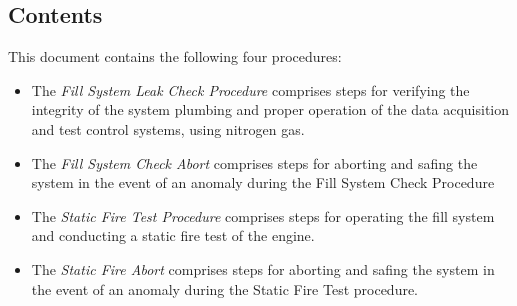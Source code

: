 
\subsection{Contents}
This document contains the following four procedures:
\begin{itemize}
    \item The \textit{Fill System Leak Check Procedure} comprises steps for verifying the integrity of the system plumbing and proper operation of the data acquisition and test control systems, using nitrogen gas.
    \item The \textit{Fill System Check Abort} comprises steps for aborting and safing the system in the event of an anomaly during the Fill System Check Procedure
    \item The \textit{Static Fire Test Procedure} comprises steps for operating the fill system and conducting a static fire test of the engine.
    \item The \textit{Static Fire Abort} comprises steps for aborting and safing the system in the event of an anomaly during the Static Fire Test procedure. 
\end{itemize}

